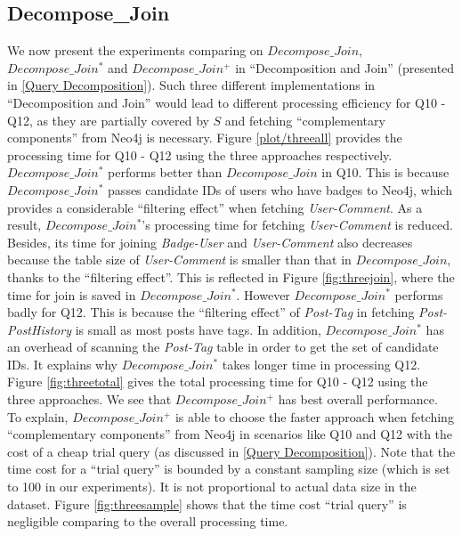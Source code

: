 \subsection{Decompose\_Join}
\label{exp:DecomposeJoin}
We now present the experiments comparing on $Decompose\_Join$, $Decompose\_Join^{*}$ and $Decompose\_Join^{+}$ in ``Decomposition and Join'' (presented in \ref{Query Decomposition}). Such three different implementations in ``Decomposition and Join'' would lead to different processing efficiency for Q10 - Q12, as they are partially covered by $S$ and fetching ``complementary components'' from Neo4j is necessary. Figure \ref{plot/threeall} provides the processing time for Q10 - Q12 using the three approaches respectively. $Decompose\_Join^{*}$ performs  better than $Decompose\_Join$ in Q10. This is because $Decompose\_Join^{*}$ passes candidate IDs of users who have badges to Neo4j, which provides a considerable ``filtering effect'' when fetching \textit{User-Comment}. As a result, $Decompose\_Join^{*}$'s processing time for fetching \textit{User-Comment} is reduced. Besides, its time for joining \textit{Badge-User} and \textit{User-Comment} also decreases because the table size of \textit{User-Comment} is smaller than that in $Decompose\_Join$, thanks to the ``filtering effect''. This is reflected in Figure \ref{fig:threejoin}, where the time for join is saved in $Decompose\_Join^{*}$. However $Decompose\_Join^{*}$ performs badly for Q12. This is because the ``filtering effect'' of \textit{Post-Tag} in fetching \textit{Post-PostHistory} is small as most posts have tags. In addition, $Decompose\_Join^{*}$ has an overhead of scanning the \textit{Post-Tag} table in order to get the set of candidate IDs. It explains why $Decompose\_Join^{*}$ takes longer time in processing Q12. Figure \ref{fig:threetotal} gives the total processing time for Q10 - Q12 using the three approaches. We see that $Decompose\_Join^{+}$ has best overall performance. To explain,  $Decompose\_Join^{+}$ is able to choose the faster approach when fetching ``complementary components'' from Neo4j in scenarios like Q10 and Q12 with  the cost of a cheap trial query (as discussed in \ref{Query Decomposition}). Note that the time cost for a ``trial query'' is bounded by a constant sampling size (which is set to 100 in our experiments). It is not proportional to actual data size in the dataset. Figure \ref{fig:threesample} shows that the time cost ``trial query'' is negligible comparing to the overall processing time. 


